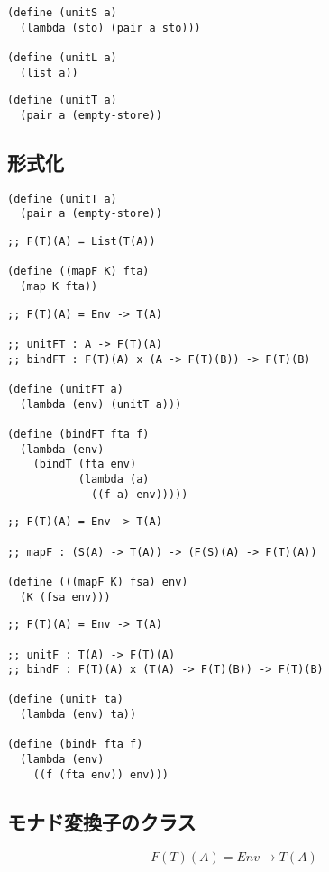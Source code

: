 \documentclass[11pt, oneside]{jsbook}   	%
\begin{document}
\begin{lstlisting}
(define (unitS a)
  (lambda (sto) (pair a sto)))

(define (unitL a)
  (list a)) 
\end{lstlisting}

\begin{lstlisting}
(define (unitT a)
  (pair a (empty-store))
  \end{lstlisting}

\subsection{  形式化 }
\begin{lstlisting}
(define (unitT a)
  (pair a (empty-store))
\end{lstlisting}

\begin{lstlisting}
;; F(T)(A) = List(T(A))

(define ((mapF K) fta)
  (map K fta))
\end{lstlisting}

\begin{lstlisting}
;; F(T)(A) = Env -> T(A)

;; unitFT : A -> F(T)(A)
;; bindFT : F(T)(A) x (A -> F(T)(B)) -> F(T)(B)

(define (unitFT a)
  (lambda (env) (unitT a)))

(define (bindFT fta f)
  (lambda (env)
    (bindT (fta env)
           (lambda (a)
             ((f a) env)))))
\end{lstlisting}

\begin{lstlisting}  
;; F(T)(A) = Env -> T(A)

;; mapF : (S(A) -> T(A)) -> (F(S)(A) -> F(T)(A))

(define (((mapF K) fsa) env)
  (K (fsa env)))
\end{lstlisting}

\begin{lstlisting}
;; F(T)(A) = Env -> T(A)

;; unitF : T(A) -> F(T)(A)
;; bindF : F(T)(A) x (T(A) -> F(T)(B)) -> F(T)(B)

(define (unitF ta)
  (lambda (env) ta))

(define (bindF fta f)
  (lambda (env)
    ((f (fta env)) env)))
\end{lstlisting}

\subsection{ モナド変換子のクラス }
$$
F(T)(A) = Env \rightarrow T(A)
$$
\end{document}
